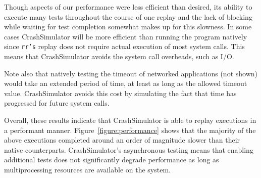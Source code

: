 Though aspects of our performance were less efficient than desired, its
ability to execute many tests throughout the course of one replay and the
lack of blocking while waiting for test completion somewhat makes up for
this slowness. In some cases CrashSimulator will be more efficient than
running the program natively since {\tt rr's} replay does not require
actual execution of most system calls.  This means that CrashSimulator
avoids the system call overheads, such as I/O.

Note also that natively testing the timeout of networked applications (not
shown) would take an extended period of time, at least as long as the
allowed timeout value.  CrashSimulator avoids this cost by simulating the
fact that time has progressed for future system calls.

Overall, these results indicate that CrashSimulator is able to replay
executions in a performant manner.  Figure~\ref{figure:performance} shows
that the majority of the above executions completed around an order of
magnitude slower than their native counterparts.  CrashSimulator's
asynchronous testing means that enabling additional tests does not
significantly degrade performance as long as multiprocessing resources are
available on the system.
